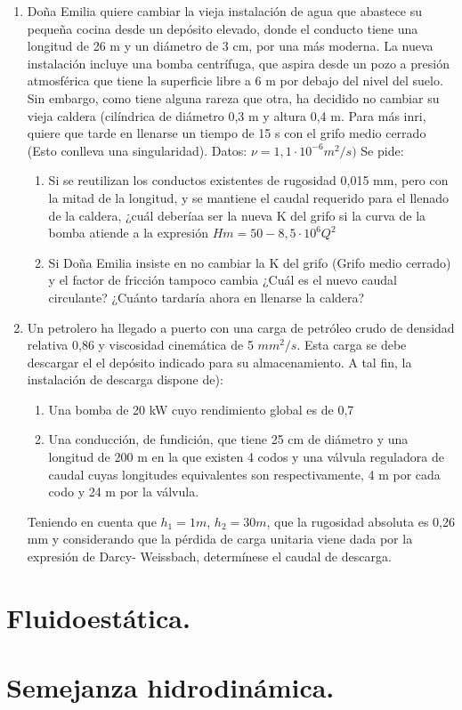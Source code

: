 \begin{enumerate}
	
	\item Doña Emilia quiere cambiar la vieja instalación de agua que abastece su pequeña cocina
	desde un depósito elevado, donde el conducto tiene una longitud de 26 m y un diámetro
	de 3 cm, por una más moderna. La nueva instalación incluye una bomba centrífuga, que
	aspira desde un pozo a presión atmosférica que tiene la superficie libre a 6 m por debajo del
	nivel del suelo. Sin embargo, como tiene alguna rareza que otra, ha decidido no cambiar su
	vieja caldera (cilíndrica de diámetro 0,3 m y altura 0,4 m. Para más inri, quiere que tarde
	en llenarse un tiempo de 15 s con el grifo medio cerrado (Esto conlleva una singularidad).  Datos: $\nu = 1, 1 \cdot 10^{-6}m^2/s)$ Se pide:
	\begin{enumerate}
		\item Si se reutilizan los conductos existentes de rugosidad 0,015 mm, pero con la mitad
		de la longitud, y se mantiene el caudal requerido para el llenado de la caldera, ¿cuál
		deberíaa ser la nueva K del grifo si la curva de la bomba atiende a la expresión $Hm = 50 - 8,5 \cdot 10^6Q^2$
		
		\item Si Doña Emilia insiste en no cambiar la K del grifo (Grifo medio cerrado) y el factor de fricción tampoco cambia ¿Cuál es el nuevo caudal circulante? ¿Cuánto tardaría
		ahora en llenarse la caldera?
	\end{enumerate}
	
	\item Un petrolero ha llegado a puerto con una carga de petróleo crudo de densidad relativa 0,86
	y viscosidad cinemática de 5 $mm^2/s$. Esta carga se debe descargar el el depósito indicado
	para su almacenamiento. A tal fin, la instalación de descarga dispone de):
	
	\begin{enumerate}
		\item Una bomba de 20 kW cuyo rendimiento global es de 0,7
		\item Una conducción, de fundición, que tiene 25 cm de diámetro y una longitud de 200
		m en la que existen 4 codos y una válvula reguladora de caudal cuyas longitudes
		equivalentes son respectivamente, 4 m por cada codo y 24 m por la válvula.
	\end{enumerate}
	Teniendo en cuenta que $h_1 = 1 m$, $h_2 = 30 m$, que la rugosidad absoluta es 0,26 mm
	y considerando que la pérdida de carga unitaria viene dada por la expresión de Darcy-
	Weissbach, determínese el caudal de descarga.
	
	

\end{enumerate}
\black
\section{Fluidoestática.}
\section{Semejanza hidrodinámica.}